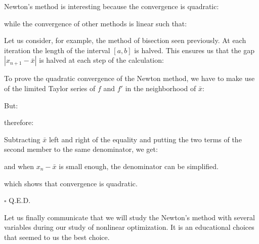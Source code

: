 	\begin{theorem}
	Newton's method is interesting because the convergence is quadratic:
	
	while the convergence of other methods is linear such that:
	
	Let us consider, for example, the method of bisection seen previously. At each iteration the length of the interval $[a, b]$ is halved. This ensures us that the gap $|x_{n+1}-\bar{x}|$ is halved at each step of the calculation:
	
	\end{theorem}
	\begin{dem}
	To prove the quadratic convergence of the Newton method, we have to make use of the limited Taylor series of $f$ and $f'$ in the neighborhood of $\bar{x}$:
	
	But:
	
	therefore:
	
	Subtracting $\bar{x}$ left and right of the equality and putting the two terms of the second member to the same denominator, we get:
	
	and when $x_n-\bar{x}$ is small enough, the denominator can be simplified.
	
	which shows that convergence is quadratic.
	\begin{flushright}
		$\square$  Q.E.D.
	\end{flushright}
	\end{dem}
	\begin{tcolorbox}[title=Remark,colframe=black,arc=10pt]
	Let us finally communicate that we will study the Newton's method with several variables during our study of nonlinear optimization. It is an educational choices that seemed to us the best choice.
	\end{tcolorbox}	
